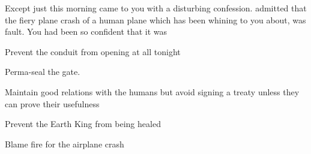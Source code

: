 \documentclass[char]{elementals}
\begin{document}
Except just this morning \cNaturalist{} came to you with a disturbing confession.  admitted that the fiery plane crash of a human plane which \cLeader{} has been whining to you about, was \cNaturalist{\their} fault. You had been so confident that it was 

\begin{itemz}[Goals]
	\item  Prevent the conduit from opening at all tonight
	\item  Perma-seal the gate. 
	\item  Maintain good relations with the humans but avoid signing a treaty unless they can prove their usefulness
	\item  Prevent the Earth King from being healed
	\item  Blame fire for the airplane crash
\end{itemz}

\begin{contacts}
	\contact{\cLeader{}}
	
\end{contacts} 
\end{document}
